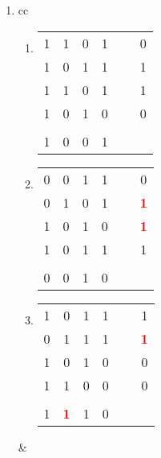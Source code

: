 \documentclass[ngerman]{scrartcl}
\begin{document}
	\begin{enumerate}[label=\alph*)]
	\item
	\begin{tabular}{cc}
		\begin{minipage}{.5\linewidth}
			\begin{enumerate}[label=\roman*)]
				\item
				\begin{tabular} {c c c c c c }
					1 & 1 & 0 & 1 & \  & 0                             \\
					1 & 0 & 1 & 1 & \  & 1                             \\
					1 & 1 & 0 & 1 & \  & 1                             \\
					1 & 0 & 1 & 0 & \  & 0                             \\
					  &   &   &   &    &                               \\
					1 & 0 & 0 & 1 &    &                               \\
				\end{tabular}
				\newline
				\newline
				\item
				\begin{tabular} {c c c c c c }
					0 & 0 & 1 & 1 & \  & 0                             \\
					0 & 1 & 0 & 1 & \  & {\textcolor{red}{\textbf{1}}} \\
					1 & 0 & 1 & 0 & \  & {\textcolor{red}{\textbf{1}}} \\
					1 & 0 & 1 & 1 & \  & 1                             \\
				 	  &   &   &   &    &                               \\
					0 & 0 & 1 & 0 &    &                               \\
				\end{tabular}
				\newline
				\newline
				\item
				\begin{tabular} {c c c c c c }
					1 & 0 & 1 & 1 & \  & 1                             \\
					0 & 1 & 1 & 1 & \  & {\textcolor{red}{\textbf{1}}} \\
					1 & 0 & 1 & 0 & \  & 0                             \\
					1 & 1 & 0 & 0 & \  & 0                             \\
					  &   &   &   &    &                               \\
					1 & {\textcolor{red}{\textbf{1}}} & 1 & 0 &   &    \\
				\end{tabular}
			\end{enumerate}
		\end{minipage} &


\end{tabular}
\end{enumerate}
\end{document}
